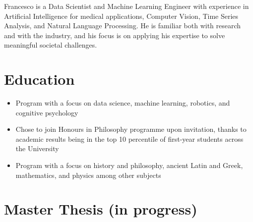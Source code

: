 \documentclass[11pt,a4paper,sans]{moderncv}        %
\begin{document}
\makecvtitle

Francesco is a Data Scientist and Machine Learning Engineer with experience in Artificial Intelligence for medical applications, Computer Vision, Time Series Analysis, and Natural Language Processing. He is familiar both with research and with the industry, and his focus is on applying his expertise to solve meaningful societal challenges.

\section{Education}
{%
}
\vskip 0.1in
{\begin{itemize}
    \item Program with a focus on data science, machine learning, robotics, and cognitive psychology
    \item Chose to join Honours in Philosophy programme upon invitation, thanks to academic results being in the top 10 percentile of first-year students across the University
\end{itemize}}
\vskip 0.1in
{\begin{itemize}
    \item Program with a focus on history and philosophy, ancient Latin and Greek, mathematics, and physics among other subjects
\end{itemize}}

\vskip 0.25in

\section{Master Thesis (in progress)}
\end{document}
